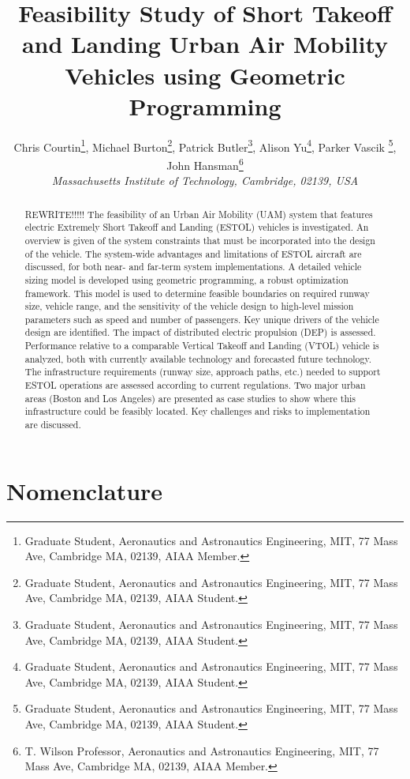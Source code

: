 \documentclass[]{aiaa-tc}%
\title{Feasibility Study of Short Takeoff and Landing Urban Air Mobility Vehicles using Geometric Programming}
\author{
  Chris Courtin\thanks{Graduate Student, Aeronautics and Astronautics Engineering, MIT, 77 Mass Ave, Cambridge MA, 02139, AIAA Member.}, 
  Michael Burton\thanks{Graduate Student, Aeronautics and Astronautics Engineering, MIT, 77 Mass Ave, Cambridge MA, 02139, AIAA Student.}, 
  Patrick Butler\thanks{Graduate Student, Aeronautics and Astronautics Engineering, MIT, 77 Mass Ave, Cambridge MA, 02139, AIAA Student.}, 
  Alison Yu\thanks{Graduate Student, Aeronautics and Astronautics Engineering, MIT, 77 Mass Ave, Cambridge MA, 02139, AIAA Student.}, 
 Parker Vascik \thanks{Graduate Student, Aeronautics and Astronautics Engineering, MIT, 77 Mass Ave, Cambridge MA, 02139, AIAA Student.}, 
  John Hansman\thanks{T. Wilson Professor, Aeronautics and Astronautics Engineering, MIT, 77 Mass Ave, Cambridge MA, 02139, AIAA Member.} \\
  {\normalsize\itshape
   Massachusetts Institute of Technology, Cambridge, 02139, USA}\\
 }
\begin{document}
\graphicspath{{./figs/}}
\maketitle

\begin{abstract}
    REWRITE!!!!!
    The feasibility of an Urban Air Mobility (UAM) system that features electric Extremely Short Takeoff and Landing (ESTOL) vehicles is investigated.  An overview is given of the system constraints that must be incorporated into the design of the vehicle.  The system-wide advantages and limitations of ESTOL aircraft are discussed, for both near- and far-term system implementations.  A detailed vehicle sizing model is developed using geometric programming, a robust optimization framework.  This model is used to determine feasible boundaries on required runway size, vehicle range, and the sensitivity of the vehicle design to high-level mission parameters such as speed and number of passengers.  Key unique drivers of the vehicle design are identified.  The impact of distributed electric propulsion (DEP) is assessed.  Performance relative to a comparable Vertical Takeoff and Landing (VTOL) vehicle is analyzed, both with currently available technology and forecasted future technology.   The infrastructure requirements (runway size, approach paths, etc.) needed to support ESTOL operations are assessed according to current regulations.  Two major urban areas (Boston and Los Angeles) are presented as case studies to show where this infrastructure could be feasibly located.  Key challenges and risks to implementation are discussed.  


\end{abstract}

\section*{Nomenclature}
\end{document}

